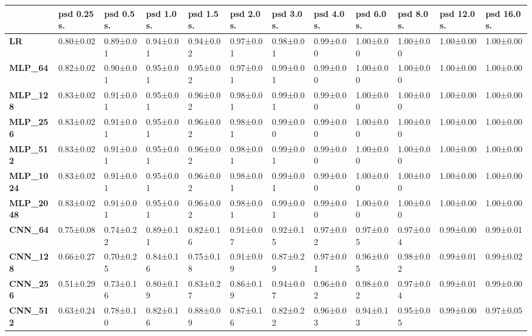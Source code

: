 \begin{tabular}{llllllllllll}
\toprule
{} & psd 0.25 s. & psd 0.5 s. & psd 1.0 s. & psd 1.5 s. & psd 2.0 s. & psd 3.0 s. & psd 4.0 s. & psd 6.0 s. & psd 8.0 s. & psd 12.0 s. & psd 16.0 s. \\
\midrule
\textbf{LR            } &   0.80±0.02 &  0.89±0.01 &  0.94±0.01 &  0.94±0.02 &  0.97±0.01 &  0.98±0.01 &  0.99±0.00 &  1.00±0.00 &  1.00±0.00 &   1.00±0.00 &   1.00±0.00 \\
\textbf{MLP\_64        } &   0.82±0.02 &  0.90±0.01 &  0.95±0.01 &  0.95±0.02 &  0.97±0.01 &  0.99±0.01 &  0.99±0.00 &  1.00±0.00 &  1.00±0.00 &   1.00±0.00 &   1.00±0.00 \\
\textbf{MLP\_128       } &   0.83±0.02 &  0.91±0.01 &  0.95±0.01 &  0.96±0.02 &  0.98±0.01 &  0.99±0.01 &  0.99±0.00 &  1.00±0.00 &  1.00±0.00 &   1.00±0.00 &   1.00±0.00 \\
\textbf{MLP\_256       } &   0.83±0.02 &  0.91±0.01 &  0.95±0.01 &  0.96±0.02 &  0.98±0.01 &  0.99±0.00 &  0.99±0.00 &  1.00±0.00 &  1.00±0.00 &   1.00±0.00 &   1.00±0.00 \\
\textbf{MLP\_512       } &   0.83±0.02 &  0.91±0.01 &  0.95±0.01 &  0.96±0.02 &  0.98±0.01 &  0.99±0.01 &  0.99±0.00 &  1.00±0.00 &  1.00±0.00 &   1.00±0.00 &   1.00±0.00 \\
\textbf{MLP\_1024      } &   0.83±0.02 &  0.91±0.01 &  0.95±0.01 &  0.96±0.02 &  0.98±0.01 &  0.99±0.01 &  0.99±0.00 &  1.00±0.00 &  1.00±0.00 &   1.00±0.00 &   1.00±0.00 \\
\textbf{MLP\_2048      } &   0.83±0.02 &  0.91±0.01 &  0.95±0.01 &  0.96±0.02 &  0.98±0.01 &  0.99±0.01 &  0.99±0.00 &  1.00±0.00 &  1.00±0.00 &   1.00±0.00 &   1.00±0.00 \\
\textbf{CNN\_64        } &   0.75±0.08 &  0.74±0.22 &  0.89±0.11 &  0.82±0.16 &  0.91±0.07 &  0.92±0.15 &  0.97±0.02 &  0.97±0.05 &  0.97±0.04 &   0.99±0.00 &   0.99±0.01 \\
\textbf{CNN\_128       } &   0.66±0.27 &  0.70±0.25 &  0.84±0.16 &  0.75±0.18 &  0.91±0.09 &  0.87±0.29 &  0.97±0.01 &  0.96±0.05 &  0.98±0.02 &   0.99±0.01 &   0.99±0.02 \\
\textbf{CNN\_256       } &   0.51±0.29 &  0.73±0.16 &  0.80±0.19 &  0.83±0.27 &  0.86±0.19 &  0.94±0.07 &  0.96±0.02 &  0.98±0.02 &  0.97±0.04 &   0.99±0.01 &   0.99±0.00 \\
\textbf{CNN\_512       } &   0.63±0.24 &  0.78±0.10 &  0.82±0.16 &  0.88±0.09 &  0.87±0.16 &  0.82±0.22 &  0.96±0.03 &  0.94±0.13 &  0.95±0.05 &   0.99±0.00 &   0.97±0.05 \\

\end{tabular}
